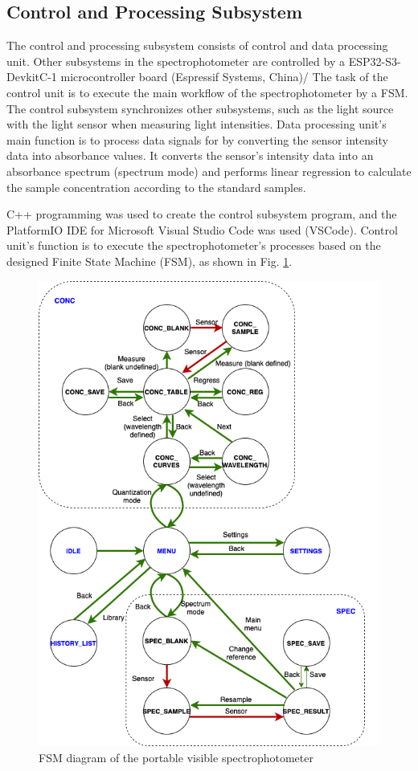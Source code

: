 \documentclass[conference]{IEEEtran}
\begin{document}
\subsection{Control and Processing Subsystem}
The control and processing subsystem consists of control and data processing unit.
Other subsystems in the spectrophotometer are controlled by a ESP32-S3-DevkitC-1 microcontroller board (Espressif Systems, China)/
The task of the control unit is to execute the main workflow of the spectrophotometer by a FSM.
The control subsystem synchronizes other subsystems, such as the light source with the light sensor when measuring light intensities.
Data processing unit's main function is to process data signals for by converting the sensor intensity data into absorbance values.
It converts the sensor's intensity data into an absorbance spectrum (spectrum mode) and performs linear regression to calculate the sample concentration according to the standard samples.

C++ programming was used to create the control subsystem program, and the PlatformIO IDE for Microsoft Visual Studio Code was used (VSCode).
Control unit's function is to execute the spectrophotometer's processes based on the designed Finite State Machine (FSM), as shown in Fig. \ref{fsm}.

    \begin{figure}[htbp]
    \centerline{\includegraphics[scale=0.35]{fsm.png}}
    \caption{FSM diagram of the portable visible spectrophotometer}
    \label{fsm}
    \end{figure}
\end{document}
